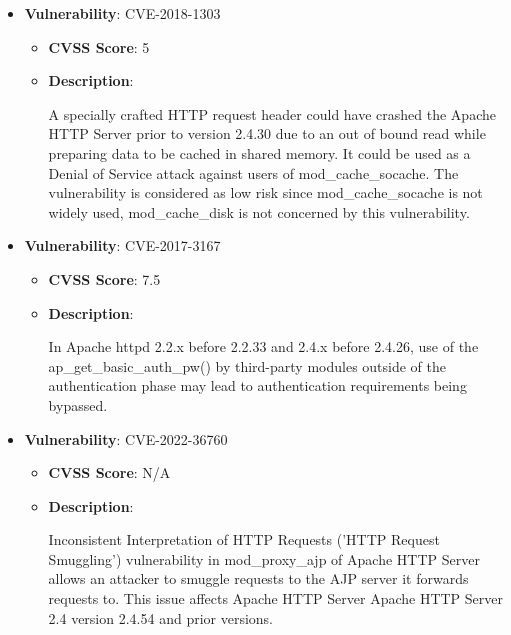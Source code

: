 \documentclass{article}
\begin{document}
\begin{itemize}
        \item \textbf{Vulnerability}: CVE-2018-1303
        \begin{itemize}
            \item \textbf{CVSS Score}:  5 
            \item \textbf{Description}:
            \parbox[t]{0.9\linewidth}{
                \ttfamily A specially crafted HTTP request header could have crashed the Apache HTTP Server prior to version 2.4.30 due to an out of bound read while preparing data to be cached in shared memory. It could be used as a Denial of Service attack against users of mod\_cache\_socache. The vulnerability is considered as low risk since mod\_cache\_socache is not widely used, mod\_cache\_disk is not concerned by this vulnerability.
            }
        \end{itemize}
    
        \item \textbf{Vulnerability}: CVE-2017-3167
        \begin{itemize}
            \item \textbf{CVSS Score}:  7.5 
            \item \textbf{Description}:
            \parbox[t]{0.9\linewidth}{
                \ttfamily In Apache httpd 2.2.x before 2.2.33 and 2.4.x before 2.4.26, use of the ap\_get\_basic\_auth\_pw() by third-party modules outside of the authentication phase may lead to authentication requirements being bypassed.
            }
        \end{itemize}
    
        \item \textbf{Vulnerability}: CVE-2022-36760
        \begin{itemize}
            \item \textbf{CVSS Score}:  N/A 
            \item \textbf{Description}:
            \parbox[t]{0.9\linewidth}{
                \ttfamily Inconsistent Interpretation of HTTP Requests ('HTTP Request Smuggling') vulnerability in mod\_proxy\_ajp of Apache HTTP Server allows an attacker to smuggle requests to the AJP server it forwards requests to.  This issue affects Apache HTTP Server Apache HTTP Server 2.4 version 2.4.54 and prior versions.
            }
        \end{itemize}
    

\end{itemize}
\end{document}

